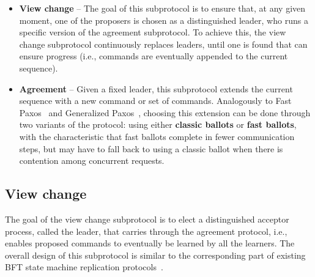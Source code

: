 \begin{itemize}
	
	\item
	{\bf View change} -- The goal of this subprotocol is to ensure that, at any given moment, one of the proposers is chosen as a distinguished leader, who runs a specific version of the agreement subprotocol. To achieve this, the view change subprotocol continuously replaces leaders, until one is found that can ensure progress (i.e., commands are eventually appended to the current sequence).
	
	\item
	{\bf Agreement} -- Given a fixed leader, this subprotocol extends the current sequence with a new command or set of commands. Analogously to Fast Paxos~\cite{L06} and Generalized Paxos~\cite{Lamport2005}, choosing this extension can be done through two variants of the protocol: using either {\bf classic ballots} or {\bf fast ballots}, with the characteristic that fast ballots complete in fewer communication steps, but may have to fall back to using a classic ballot when there is contention among concurrent requests.
	
\end{itemize}

\subsection{View change} 

The goal of the view change subprotocol is to elect a distinguished acceptor process, called the leader, that carries through the agreement protocol, i.e., enables proposed commands to eventually be learned by all the learners. The overall design of this subprotocol is similar to the corresponding part of existing BFT state machine replication protocols~\cite{CL99}.\par

